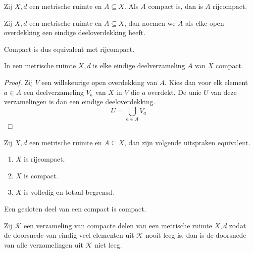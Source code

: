 \documentclass[main.tex]{subfiles}
\begin{document}
\begin{bst}
  \label{st:compact-dan-rijcompact}
  Zij $X,d$ een metrische ruimte en $A \subseteq X$.
  Als $A$ compact is, dan is $A$ rijcompact.
\end{bst}



\begin{de}
  Zij $X,d$ een metrische ruimte en $A \subseteq X$, dan noemen we $A$  als elke open overdekking een eindige deeloverdekking heeft.
\end{de}

\begin{opm}
  Compact is dus equivalent met rijcompact.
\end{opm}

\begin{st}
  \label{st:eindig-dan-compact}
  In een metrische ruimte $X,d$ is elke eindige deelverzameling $A$ van $X$ compact.

  \begin{proof}
    Zij $V$ een willekeurige open overdekking van $A$.
    Kies dan voor elk element $a\in A$ een deelverzameling $V_{a}$ van $X$ in $V$ die $a$ overdekt.
    De unie $U$ van deze verzamelingen is dan een eindige deeloverdekking.
    \[ U = \bigcup_{a\in A}V_{a} \]
  \end{proof}
\end{st}

\begin{bst}
  Zij $X,d$ een metrische ruimte en $A \subseteq X$, dan zijn volgende uitspraken equivalent.
  \begin{enumerate}
  \item $X$ is rijcompact.
  \item $X$ is compact.
  \item $X$ is volledig en totaal begrensd.
  \end{enumerate}
\end{bst}

\begin{bpr}
  Een gesloten deel van een compact is compact.
\end{bpr}

\begin{bei}
  Zij $\mathcal{K}$ een verzameling van compacte delen van een metrische ruimte $X,d$ zodat de doorsnede van eindig veel elementen uit $\mathcal{K}$ nooit leeg is, dan is de doorsnede van alle verzamelingen uit $\mathcal{K}$ niet leeg.
\end{bei}
\end{document}
